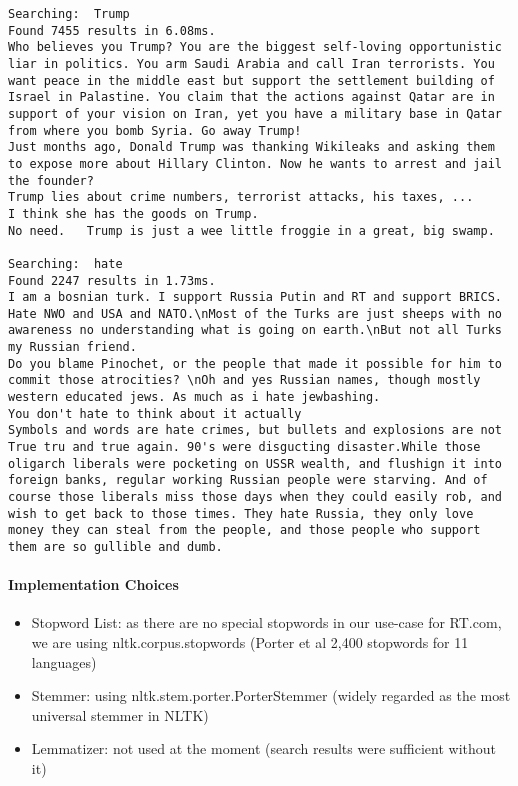 \documentclass{scrartcl}
\begin{document}
\begin{lstlisting}
Searching:  Trump
Found 7455 results in 6.08ms.
Who believes you Trump? You are the biggest self-loving opportunistic liar in politics. You arm Saudi Arabia and call Iran terrorists. You want peace in the middle east but support the settlement building of Israel in Palastine. You claim that the actions against Qatar are in support of your vision on Iran, yet you have a military base in Qatar from where you bomb Syria. Go away Trump!
Just months ago, Donald Trump was thanking Wikileaks and asking them to expose more about Hillary Clinton. Now he wants to arrest and jail the founder?
Trump lies about crime numbers, terrorist attacks, his taxes, ...
I think she has the goods on Trump.
No need.   Trump is just a wee little froggie in a great, big swamp.

Searching:  hate
Found 2247 results in 1.73ms.
I am a bosnian turk. I support Russia Putin and RT and support BRICS. Hate NWO and USA and NATO.\nMost of the Turks are just sheeps with no awareness no understanding what is going on earth.\nBut not all Turks my Russian friend.
Do you blame Pinochet, or the people that made it possible for him to commit those atrocities? \nOh and yes Russian names, though mostly western educated jews. As much as i hate jewbashing.
You don't hate to think about it actually
Symbols and words are hate crimes, but bullets and explosions are not
True tru and true again. 90's were disgucting disaster.While those oligarch liberals were pocketing on USSR wealth, and flushign it into foreign banks, regular working Russian people were starving. And of course those liberals miss those days when they could easily rob, and wish to get back to those times. They hate Russia, they only love money they can steal from the people, and those people who support them are so gullible and dumb.
\end{lstlisting}

\paragraph{Implementation Choices}

\begin{itemize}
	\item Stopword List: as there are no special stopwords in our use-case for RT.com, we are using nltk.corpus.stopwords (Porter et al	2,400 stopwords for 11 languages)
	\item Stemmer: using nltk.stem.porter.PorterStemmer (widely regarded as the most universal stemmer in NLTK)
	\item Lemmatizer: not used at the moment (search results were sufficient without it)
\end{itemize}
\end{document}
